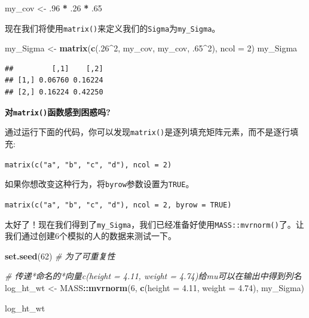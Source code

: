 \documentclass[
]{book}
\newenvironment{Shaded}{\begin{snugshade}}{\end{snugshade}}
\newcommand{\AttributeTok}[1]{\textcolor[rgb]{0.13,0.29,0.53}{#1}}
\newcommand{\CommentTok}[1]{\textcolor[rgb]{0.56,0.35,0.01}{\textit{#1}}}
\newcommand{\DecValTok}[1]{\textcolor[rgb]{0.00,0.00,0.81}{#1}}
\newcommand{\FloatTok}[1]{\textcolor[rgb]{0.00,0.00,0.81}{#1}}
\newcommand{\FunctionTok}[1]{\textcolor[rgb]{0.13,0.29,0.53}{\textbf{#1}}}
\newcommand{\NormalTok}[1]{#1}
\newcommand{\OtherTok}[1]{\textcolor[rgb]{0.56,0.35,0.01}{#1}}
\newcommand{\SpecialCharTok}[1]{\textcolor[rgb]{0.81,0.36,0.00}{\textbf{#1}}}
\begin{document}
\begin{Shaded}
\begin{Highlighting}[]
\NormalTok{my\_cov }\OtherTok{\textless{}{-}}\NormalTok{ .}\DecValTok{96} \SpecialCharTok{*}\NormalTok{ .}\DecValTok{26} \SpecialCharTok{*}\NormalTok{ .}\DecValTok{65}
\end{Highlighting}
\end{Shaded}

现在我们将使用\texttt{matrix()}来定义我们的\texttt{Sigma}为\texttt{my\_Sigma}。

\begin{Shaded}
\begin{Highlighting}[]
\NormalTok{my\_Sigma }\OtherTok{\textless{}{-}} \FunctionTok{matrix}\NormalTok{(}\FunctionTok{c}\NormalTok{(.}\DecValTok{26}\SpecialCharTok{\^{}}\DecValTok{2}\NormalTok{, my\_cov, my\_cov, .}\DecValTok{65}\SpecialCharTok{\^{}}\DecValTok{2}\NormalTok{), }\AttributeTok{ncol =} \DecValTok{2}\NormalTok{)}
\NormalTok{my\_Sigma}
\end{Highlighting}
\end{Shaded}

\begin{verbatim}
##         [,1]    [,2]
## [1,] 0.06760 0.16224
## [2,] 0.16224 0.42250
\end{verbatim}

\textbf{对\texttt{matrix()}函数感到困惑吗?}

通过运行下面的代码，你可以发现\texttt{matrix()}是逐列填充矩阵元素，而不是逐行填充:

\texttt{matrix(c("a",\ "b",\ "c",\ "d"),\ ncol\ =\ 2)}

如果你想改变这种行为，将\texttt{byrow}参数设置为\texttt{TRUE}。

\texttt{matrix(c("a",\ "b",\ "c",\ "d"),\ ncol\ =\ 2,\ byrow\ =\ TRUE)}

太好了！现在我们得到了\texttt{my\_Sigma}，我们已经准备好使用\texttt{MASS::mvrnorm()}了。让我们通过创建6个模拟的人的数据来测试一下。

\begin{Shaded}
\begin{Highlighting}[]
\FunctionTok{set.seed}\NormalTok{(}\DecValTok{62}\NormalTok{) }\CommentTok{\# 为了可重复性}

\CommentTok{\# 传递*命名的*向量c(height = 4.11, weight = 4.74)给mu可以在输出中得到列名}
\NormalTok{log\_ht\_wt }\OtherTok{\textless{}{-}}\NormalTok{ MASS}\SpecialCharTok{::}\FunctionTok{mvrnorm}\NormalTok{(}\DecValTok{6}\NormalTok{, }
                           \FunctionTok{c}\NormalTok{(}\AttributeTok{height =} \FloatTok{4.11}\NormalTok{, }\AttributeTok{weight =} \FloatTok{4.74}\NormalTok{), }
\NormalTok{                           my\_Sigma)}

\NormalTok{log\_ht\_wt}
\end{Highlighting}
\end{Shaded}
\end{document}
